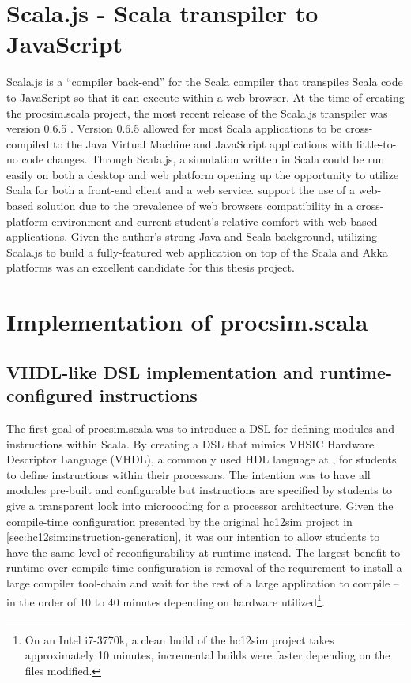 \section{Scala.js - Scala transpiler to JavaScript}

Scala.js is a ``compiler back-end'' for the Scala compiler that transpiles Scala code to JavaScript so that it can execute within a web browser. At the time of creating the procsim.scala project, the most recent release of the Scala.js transpiler was version 0.6.5 \cite{Scala-js2015}. Version 0.6.5 allowed for most Scala applications to be cross-compiled to the Java Virtual Machine and JavaScript applications with little-to-no code changes. Through Scala.js, a simulation written in Scala could be run easily on both a desktop and web platform opening up the opportunity to utilize Scala for both a front-end client and a web service.  support the use of a web-based solution due to the prevalence of web browsers compatibility in a cross-platform environment and current student's relative comfort with web-based applications. Given the author's strong Java and Scala background, utilizing Scala.js to build a fully-featured web application on top of the Scala and Akka platforms was an excellent candidate for this thesis project.

\section{Implementation of procsim.scala}

\subsection{VHDL-like DSL implementation and runtime-configured instructions}

The first goal of procsim.scala was to introduce a DSL for defining modules and instructions within Scala. By creating a DSL that mimics VHSIC Hardware Descriptor Language (VHDL), a commonly used HDL language at \uwo{}, for students to define instructions within their processors. The intention was to have all modules pre-built and configurable but instructions are specified by students to give a transparent look into microcoding for a processor architecture. Given the compile-time configuration presented by the original hc12sim project in \cref{sec:hc12sim:instruction-generation}, it was our intention to allow students to have the same level of reconfigurability at runtime instead. The largest benefit to runtime over compile-time configuration is removal of the requirement to install a large compiler tool-chain and wait for the rest of a large application to compile -- in the order of 10 to 40 minutes depending on hardware utilized\footnote{On an Intel\textregistered{} i7-3770k, a clean build of the hc12sim project takes approximately 10 minutes, incremental builds were faster depending on the files modified.}. 

